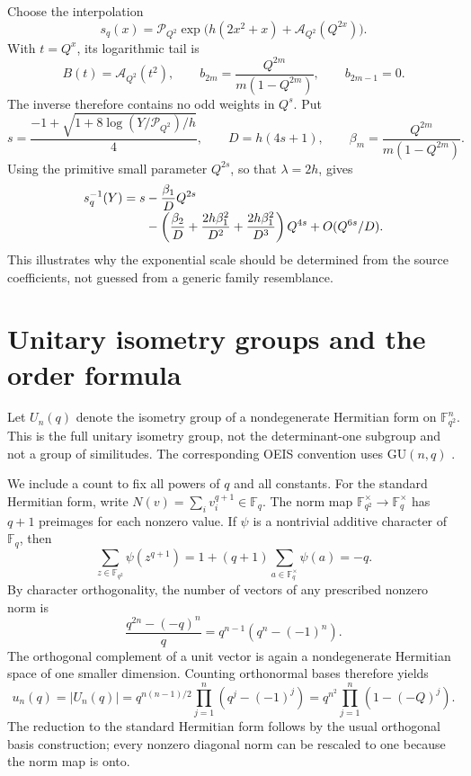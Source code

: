 \documentclass[11pt,openany]{book}
\numberwithin{equation}{chapter}
\theoremstyle{plain}
\theoremstyle{definition}
\theoremstyle{remark}
\newcommand{\F}{\mathbb F}
\begin{document}
Choose the interpolation
\begin{equation}\label{t3:eq:Sp-interp}
 s_q(x)=\mathcal P_{Q^2}
   \exp\bigl(h(2x^2+x)+\mathcal A_{Q^2}(Q^{2x})\bigr).
\end{equation}
With $t=Q^x$, its logarithmic tail is
\begin{equation}\label{t3:eq:Sp-B}
 B(t)=\mathcal A_{Q^2}(t^2),\qquad
 b_{2m}=\frac{Q^{2m}}{m(1-Q^{2m})},\qquad b_{2m-1}=0.
\end{equation}
The inverse therefore contains no odd weights in $Q^s$. Put
\begin{equation}\label{t3:eq:Sp-center}
 s=\frac{-1+\sqrt{1+8\log(Y/\mathcal P_{Q^2})/h}}4,
 \qquad D=h(4s+1),\qquad \beta_m=\frac{Q^{2m}}{m(1-Q^{2m})}.
\end{equation}
Using the primitive small parameter $Q^{2s}$, so that $\lambda=2h$, gives
\begin{align}\label{t3:eq:Sp-inverse}
 s_q^{-1}(Y)=s
 &-\frac{\beta_1}{D}Q^{2s}\\[-0.3em]
 &-\left(\frac{\beta_2}{D}
       +\frac{2h\beta_1^2}{D^2}
       +\frac{2h\beta_1^2}{D^3}\right)Q^{4s}
 +O(Q^{6s}/D).\notag
\end{align}
This illustrates why the exponential scale should be determined from the source coefficients, not guessed from a generic family resemblance.

\section{Unitary isometry groups and the order formula}

Let $U_n(q)$ denote the isometry group of a nondegenerate Hermitian form on $\F_{q^2}^n$. This is the full unitary isometry group, not the determinant-one subgroup and not a group of similitudes. The corresponding OEIS convention uses $\mathrm{GU}(n,q)$ \cite{oeisU}.

We include a count to fix all powers of $q$ and all constants. For the standard Hermitian form, write $N(v)=\sum_i v_i^{q+1}\in\F_q$. The norm map $\F_{q^2}^{\times}\to\F_q^{\times}$ has $q+1$ preimages for each nonzero value. If $\psi$ is a nontrivial additive character of $\F_q$, then
\[
 \sum_{z\in\F_{q^2}}\psi(z^{q+1})
 =1+(q+1)\sum_{a\in\F_q^{\times}}\psi(a)=-q.
\]
By character orthogonality, the number of vectors of any prescribed nonzero norm is
\begin{equation}\label{t3:eq:unitnorm}
 \frac{q^{2n}-(-q)^n}{q}=q^{n-1}(q^n-(-1)^n).
\end{equation}
The orthogonal complement of a unit vector is again a nondegenerate Hermitian space of one smaller dimension. Counting orthonormal bases therefore yields
\begin{equation}\label{t3:eq:U-count}
 u_n(q)=|U_n(q)|
 =q^{n(n-1)/2}\prod_{j=1}^n(q^j-(-1)^j)
 =q^{n^2}\prod_{j=1}^n(1-(-Q)^j).
\end{equation}
The reduction to the standard Hermitian form follows by the usual orthogonal basis construction; every nonzero diagonal norm can be rescaled to one because the norm map is onto.
\end{document}
